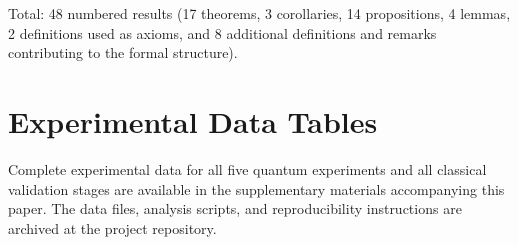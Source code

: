 \documentclass[twocolumn,10pt,a4paper]{article}
\theoremstyle{definition}
\theoremstyle{remark}
\begin{document}
Total: 48 numbered results (17 theorems, 3 corollaries, 14 propositions, 4 lemmas, 2 definitions used as axioms, and 8 additional definitions and remarks contributing to the formal structure).


\section{Experimental Data Tables}
\label{app:data}

Complete experimental data for all five quantum experiments and all classical validation stages are available in the supplementary materials accompanying this paper. The data files, analysis scripts, and reproducibility instructions are archived at the project repository.
\end{document}
